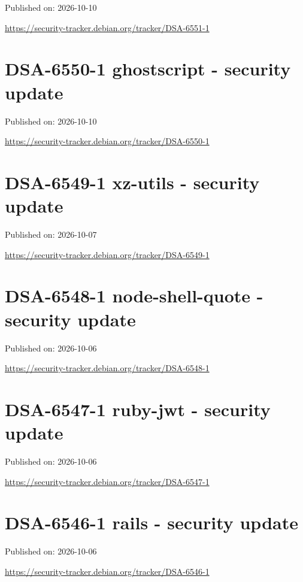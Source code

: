 \documentclass[11pt,a4paper]{article}
\begin{document}
Published on: 2026-10-10

\href{https://security-tracker.debian.org/tracker/DSA-6551-1}{https://security-tracker.debian.org/tracker/DSA-6551-1}

\section{DSA-6550-1 ghostscript - security update}

Published on: 2026-10-10

\href{https://security-tracker.debian.org/tracker/DSA-6550-1}{https://security-tracker.debian.org/tracker/DSA-6550-1}

\section{DSA-6549-1 xz-utils - security update}

Published on: 2026-10-07

\href{https://security-tracker.debian.org/tracker/DSA-6549-1}{https://security-tracker.debian.org/tracker/DSA-6549-1}

\section{DSA-6548-1 node-shell-quote - security update}

Published on: 2026-10-06

\href{https://security-tracker.debian.org/tracker/DSA-6548-1}{https://security-tracker.debian.org/tracker/DSA-6548-1}

\section{DSA-6547-1 ruby-jwt - security update}

Published on: 2026-10-06

\href{https://security-tracker.debian.org/tracker/DSA-6547-1}{https://security-tracker.debian.org/tracker/DSA-6547-1}

\section{DSA-6546-1 rails - security update}

Published on: 2026-10-06

\href{https://security-tracker.debian.org/tracker/DSA-6546-1}{https://security-tracker.debian.org/tracker/DSA-6546-1}
\end{document}
